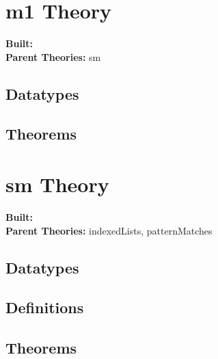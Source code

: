 \documentclass[11pt, twoside]{article}
\begin{document}



\tableofcontents
\cleardoublepage
\HOLpagestyle

\section{m1 Theory}
\begin{flushleft}
\textbf{Built:} \HOLmOneDate \\[2pt]
\textbf{Parent Theories:} sm
\end{flushleft}

\subsection{Datatypes}

\HOLmOneDatatypes


\subsection{Theorems}

\HOLmOneTheorems

\section{sm Theory}
\begin{flushleft}
\textbf{Built:} \HOLsmDate \\[2pt]
\textbf{Parent Theories:} indexedLists, patternMatches
\end{flushleft}

\subsection{Datatypes}

\HOLsmDatatypes

\subsection{Definitions}

\HOLsmDefinitions

\subsection{Theorems}

\HOLsmTheorems

\HOLindex
\end{document}

